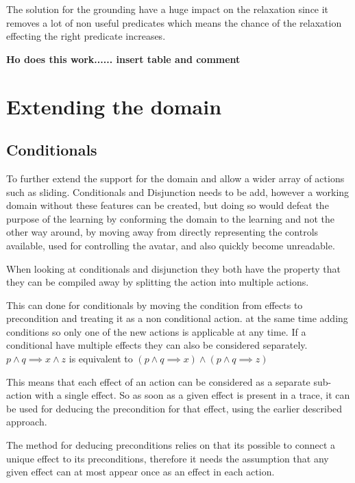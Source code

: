 The solution for the grounding have a huge impact on the relaxation since it removes a lot of non useful predicates which means the chance of the relaxation effecting the right predicate increases.
 
 
 \textbf{\huge Ho does this work...... insert table and comment}

\section{Extending the domain}
\subsection{Conditionals}	

	To further extend the support for the domain and allow a wider array of actions such as sliding. Conditionals and Disjunction needs to be add, however a working domain without these features can be created, but doing so would defeat the purpose of the learning by conforming the domain to the learning and not the other way around, by moving away from directly representing the controls available, used for controlling the avatar, and also quickly become unreadable.

	When looking at conditionals and disjunction they both have the property that they can be compiled away by splitting the action into multiple actions. %
	
	This can done for conditionals by moving the condition from effects to precondition and treating it as a non conditional action. at the same time adding conditions so only one of the new actions is applicable at any time. If a conditional have multiple effects they can also be considered separately.
	$p \land q \implies x \land z$
	is equivalent to 
	$(p \land q \implies x)
	\land
	(p \land q \implies z)$
	
	
	This means that each effect of an action can be considered as a separate sub-action with a single effect. So as soon as a given effect is present in a trace, it can be used for deducing the precondition for that effect, using the earlier described approach. 
	
	The method for deducing preconditions relies on that its possible to connect a unique effect to its preconditions, therefore it needs the assumption that any given effect can at most appear once as an effect in each action.
	
